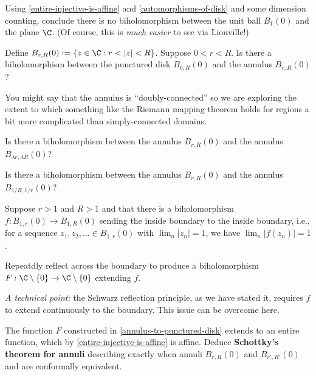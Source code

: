 \documentclass{homework}
\begin{document}
\begin{problem}
  Using \ref{entire-injective-is-affine} and
  \ref{automorphisms-of-disk} and some dimension counting, conclude
  there is no biholomorphism between the unit ball $B_1(0)$ and the
  plane $\C$.  (Of course, this is \textit{much easier} to see via
  Liouville!)
\end{problem}

\begin{problem}
  Define \(B_{r,R}(0) := \{ z \in \C : r < |z| < R \}\). 
  Suppose $0 < r < R$.  Is there a biholomorphism between the
  punctured disk $B_{0,R}(0)$ and the annulus $B_{r,R}(0)$?

  You might say that the annulus is ``doubly-connected'' so we are
  exploring the extent to which something like the Riemann mapping
  theorem holds for regions a bit more complicated than
  simply-connected domains.
\end{problem}

\begin{problem}
  Is there a biholomorphism between the annulus $B_{r,R}(0)$ and the
  annulus $B_{\lambda r, \lambda R}(0)$?
\end{problem}

\begin{problem}
  Is there a biholomorphism between the annulus $B_{r,R}(0)$ and the
  annulus $B_{1/R,1/r}(0)$?
\end{problem}

\begin{problem}\label{annulus-to-punctured-disk}Suppose $r > 1$ and $R > 1$ and that there is a biholomorphism
  $f : B_{1,r}(0) \to B_{1,R}(0)$ sending the inside boundary to the
  inside boundary, i.e., for a sequence
  $z_1, z_2, \ldots \in B_{1,r}(0)$ with $\lim_n |z_n| = 1$, we have
  $\lim_n |f(z_n)| = 1$.
  
  Repeatdly reflect across the boundary to produce a biholomorphism
  $F : \C \setminus \{0\} \to \C \setminus \{0\}$ extending $f$.

  \textit{A technical point:} the Schwarz reflection principle, as we
  have stated it, requires $f$ to extend continuously to the boundary.
  This issue can be overcome here.
\end{problem}

\begin{problem}
  The function $F$ constructed in \ref{annulus-to-punctured-disk}
  extends to an entire function, which by
  \ref{entire-injective-is-affine} is affine.  Deduce
  \textbf{Schottky's theorem for annuli} describing exactly when
  annuli $B_{r,R}(0)$ and $B_{r',R'}(0)$ and are conformally
  equivalent.
\end{problem}
\end{document}
